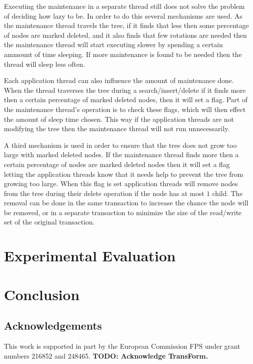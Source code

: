 \documentclass[10pt]{sigplanconf}
\begin{document}
Executing the maintenance in a separate thread still does not solve the problem of deciding how lazy to be.
In order to do this several mechanisms are used.
As the maintenance thread travels the tree, if it finds that less then some percentage of nodes are marked deleted, and it also finds that few rotations are needed
then the maintenance thread will start executing slower by spending a certain ammount of time sleeping.
If more maintenance is found to be needed then the thread will sleep less often.

Each application thread can also influence the amount of maintenance done.
When the thread traverses the tree during a search/insert/delete if it finds more then a certain percentage of marked deleted nodes, then it will set a flag.
Part of the maintenance thread's operation is to check these flags, which will then effect the amount of sleep time chosen.
This way if the application threads are not modifying the tree then the maintenance thread will not run unnecessarily.

A third mechanism is used in order to ensure that the tree does not grow too large with marked deleted nodes.
If the maintenance thread finds more then a certain percentage of nodes are marked deleted nodes then it will set a flag letting the application threads know that it needs help
to prevent the tree from growing too large.
When this flag is set application threads will remove nodes from the tree during their delete operation if the node has at most $1$ child.
The removal can be done in the same transaction to increase the chance the node will be removed, or in a separate transaction to minimize the size of the read/write set of the
original transaction.


\section{Experimental Evaluation}

\section{Conclusion}

\subsection*{Acknowledgements}
This work is supported in part by the European Commission FPS under grant numbers 216852 and 248465.
{\bf TODO: Acknowledge TransForm.}




\end{document}
